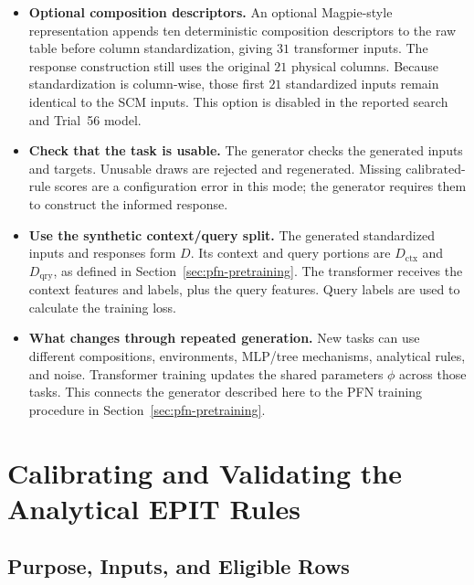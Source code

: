 \documentclass[11pt]{article}
\newenvironment{notes}
  {\begin{itemize}\setlength{\itemsep}{0.45em}\setlength{\parsep}{0pt}}
  {\end{itemize}}
\begin{document}
\begin{notes}
    \item \textbf{Optional composition descriptors.}
    An optional Magpie-style representation appends ten
    deterministic composition descriptors to the raw table
    before column standardization, giving \(31\) transformer
    inputs. The response construction still uses the original
    \(21\) physical columns. Because standardization is
    column-wise, those first \(21\) standardized inputs remain
    identical to the SCM inputs.
    This option is disabled in the reported search and
    Trial~56 model.

    \item \textbf{Check that the task is usable.}
    The generator checks the generated inputs and targets.
    Unusable draws are rejected and regenerated.
    Missing calibrated-rule scores are a configuration error
    in this mode; the generator requires them to construct
    the informed response.

    \item \textbf{Use the synthetic context/query split.}
    The generated standardized inputs and responses form \(D\).
    Its context and query portions are \(D_{\mathrm{ctx}}\)
    and \(D_{\mathrm{qry}}\), as defined in
    Section~\ref{sec:pfn-pretraining}.
    The transformer receives the context features and labels,
    plus the query features. Query labels are used to calculate
    the training loss.

    \item \textbf{What changes through repeated generation.}
    New tasks can use different compositions, environments,
    MLP/tree mechanisms, analytical rules, and noise.
    Transformer training updates the shared parameters
    \(\phi\) across those tasks. This connects the generator
    described here to the PFN training procedure in
    Section~\ref{sec:pfn-pretraining}.
\end{notes}

\section{Calibrating and Validating the Analytical EPIT Rules}
\label{sec:rule-calibration}

\subsection{Purpose, Inputs, and Eligible Rows}
\label{sec:calibration-scope}
\end{document}
